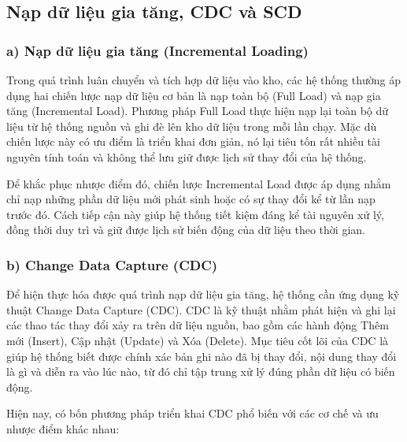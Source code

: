 \subsection{Nạp dữ liệu gia tăng, CDC và SCD}

\subsubsection*{a) Nạp dữ liệu gia tăng (Incremental Loading)}

Trong quá trình luân chuyển và tích hợp dữ liệu vào kho, các hệ thống thường áp dụng hai chiến lược nạp dữ liệu cơ bản là nạp toàn bộ (Full Load) và nạp gia tăng (Incremental Load). Phương pháp Full Load thực hiện nạp lại toàn bộ dữ liệu từ hệ thống nguồn và ghi đè lên kho dữ liệu trong mỗi lần chạy. Mặc dù chiến lược này có ưu điểm là triển khai đơn giản, nó lại tiêu tốn rất nhiều tài nguyên tính toán và không thể lưu giữ được lịch sử thay đổi của hệ thống. 

Để khắc phục nhược điểm đó, chiến lược Incremental Load được áp dụng nhằm chỉ nạp những phần dữ liệu mới phát sinh hoặc có sự thay đổi kể từ lần nạp trước đó. Cách tiếp cận này giúp hệ thống tiết kiệm đáng kể tài nguyên xử lý, đồng thời duy trì và giữ được lịch sử biến động của dữ liệu theo thời gian.

\vspace{0.5em}
\subsubsection*{b) Change Data Capture (CDC)}

Để hiện thực hóa được quá trình nạp dữ liệu gia tăng, hệ thống cần ứng dụng kỹ thuật Change Data Capture (CDC). CDC là kỹ thuật nhằm phát hiện và ghi lại các thao tác thay đổi xảy ra trên dữ liệu nguồn, bao gồm các hành động Thêm mới (Insert), Cập nhật (Update) và Xóa (Delete). Mục tiêu cốt lõi của CDC là giúp hệ thống biết được chính xác bản ghi nào đã bị thay đổi, nội dung thay đổi là gì và diễn ra vào lúc nào, từ đó chỉ tập trung xử lý đúng phần dữ liệu có biến động.

Hiện nay, có bốn phương pháp triển khai CDC phổ biến với các cơ chế và ưu nhược điểm khác nhau:

